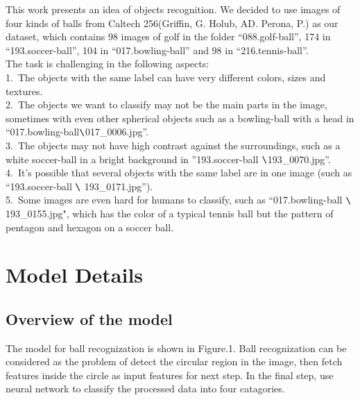 \documentclass{article}
\begin{document}
This work presents an idea of objects recognition. We decided to use images of four kinds of balls from Caltech 256(Griffin, G. Holub, AD. Perona, P.) as our dataset, which contains 98 images of golf in the folder ``088.golf-ball'', 174 in ``193.soccer-ball'', 104 in ``017.bowling-ball'' and 98 in ``216.tennis-ball''.\\
The task is challenging in the following aspects:\\
1.\ The objects with the same label can have very different colors, sizes and textures.\\
2.\ The objects we want to classify may not be the main parts in the image, sometimes with even other spherical objects
such as a bowling-ball with a head in ``017.bowling-ball$ \verb|\|$017\_0006.jpg''.\\
3.\ The objects may not have high contrast against the surroundings, such as a white soccer-ball in a bright background in ''193.soccer-ball $ \verb|\|$193\_0070.jpg''.\\
4.\ It's possible that several objects with the same label are in one image (such as ``193.soccer-ball $ \verb|\|$ 193\_0171.jpg'').\\
5.\ Some images are even hard for humans to classify, such as ``017.bowling-ball $ \verb|\|$ 193\_0155.jpg", which has the color of a typical tennis ball but the pattern of pentagon and hexagon on a soccer ball.\\


\section{Model Details} 


\subsection{Overview of the model}
The model for ball recognization is shown in Figure.1. Ball recognization can be considered as the problem of detect the circular region in the image, then fetch features inside the circle as input features for next step. In the final step, use neural network to classify the processed data into four catagories.\\
\end{document}
